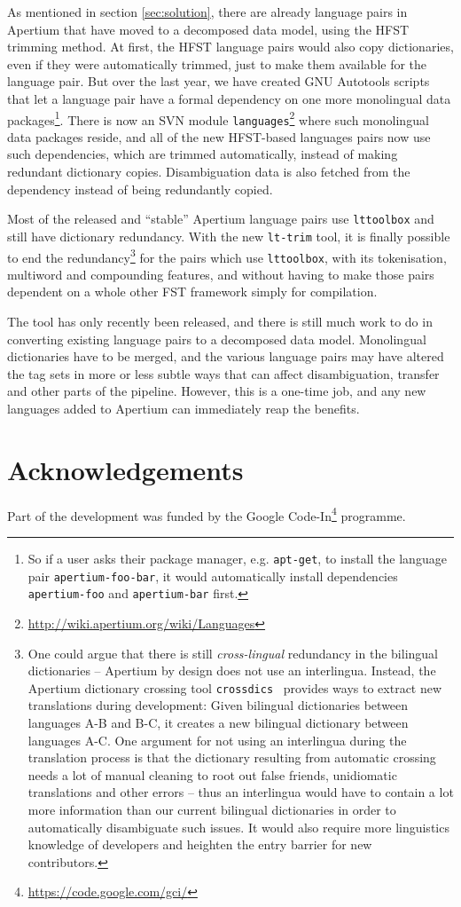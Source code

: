\documentclass[10pt, a4paper]{article}
\newcommand{\tool}[1]{\texttt{#1}}
\begin{document}
As mentioned in section \ref{sec:solution}, there are already language
pairs in Apertium that have moved to a decomposed data model, using
the HFST trimming method. At first, the HFST language pairs would also
copy dictionaries, even if they were automatically trimmed, just to
make them available for the language pair.  But over the last year, we
have created GNU Autotools scripts that let a language pair have a
formal dependency on one more monolingual data packages\footnote{So if
  a user asks their package manager, e.g. \tool{apt-get}, to install
  the language pair \tool{apertium-foo-bar}, it would automatically
  install dependencies \tool{apertium-foo} and \tool{apertium-bar}
  first.}. There is now an SVN module
\texttt{languages}\footnote{\href{http://wiki.apertium.org/wiki/Languages}{http://wiki.apertium.org/wiki/Languages}}
where such monolingual data packages reside, and all of the new
HFST-based languages pairs now use such dependencies, which are
trimmed automatically, instead of making redundant dictionary copies.
Disambiguation data is also fetched from the dependency instead of
being redundantly copied.

Most of the released and ``stable'' Apertium language pairs use
\tool{lttoolbox} and still have dictionary redundancy. With the new
\tool{lt-trim} tool, it is finally possible to end the
redundancy\footnote{One could argue that there is still
  \emph{cross-lingual} redundancy in the bilingual dictionaries --
  Apertium by design does not use an interlingua. Instead, the
  Apertium dictionary crossing tool
  \tool{crossdics}~\cite{toral2011crossdics-it-ca} provides ways to
  extract new translations during development: Given bilingual
  dictionaries between languages A-B and B-C, it creates a new
  bilingual dictionary between languages A-C. One argument for not
  using an interlingua during the translation process is that the
  dictionary resulting from automatic crossing needs a lot of manual
  cleaning to root out false friends, unidiomatic translations and
  other errors -- thus an interlingua would have to contain a lot more
  information than our current bilingual dictionaries in order to
  automatically disambiguate such issues. It would also require more
  linguistics knowledge of developers and heighten the entry barrier
  for new contributors.} for the pairs which use \tool{lttoolbox},
with its tokenisation, multiword and compounding features, and without
having to make those pairs dependent on a whole other FST framework
simply for compilation.

The tool has only recently been released, and there is still much work
to do in converting existing language pairs to a decomposed data
model. Monolingual dictionaries have to be merged, and the various
language pairs may have altered the tag sets in more or less subtle
ways that can affect disambiguation, transfer and other parts of the
pipeline. However, this is a one-time job, and any new languages added
to Apertium can immediately reap the benefits.

\section*{Acknowledgements}
Part of the development was funded by the Google
Code-In\footnote{\href{https://code.google.com/gci/}{https://code.google.com/gci/}} programme.



\end{document}
